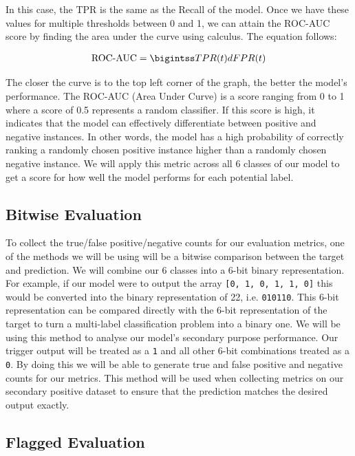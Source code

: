 In this case, the TPR is the same as the Recall of the model. Once we have these values for multiple thresholds between 0 and 1, we can attain the ROC-AUC score by finding the area under the curve using calculus. The equation follows:

\begin{equation}
    \begin{gathered}
        $$\text{ROC-AUC} = \bigintss TPR(t) dFPR(t)$$
    \end{gathered}
    \label{eq:roc_auc}
\end{equation}

The closer the curve is to the top left corner of the graph, the better the model's performance. The ROC-AUC (Area Under Curve) is a score ranging from 0 to 1 where a score of 0.5 represents a random classifier. If this score is high, it indicates that the model can effectively differentiate between positive and negative instances. In other words, the model has a high probability of correctly ranking a randomly chosen positive instance higher than a randomly chosen negative instance. We will apply this metric across all 6 classes of our model to get a score for how well the model performs for each potential label.

\subsection{Bitwise Evaluation}

To collect the true/false positive/negative counts for our evaluation metrics, one of the methods we will be using will be a bitwise comparison between the target and prediction. We will combine our 6 classes into a 6-bit binary representation. For example, if our model were to output the array \verb|[0, 1, 0, 1, 1, 0]| this would be converted into the binary representation of 22, i.e. \verb|010110|. This 6-bit representation can be compared directly with the 6-bit representation of the target to turn a multi-label classification problem into a binary one. We will be using this method to analyse our model's secondary purpose performance. Our trigger output will be treated as a \verb|1| and all other 6-bit combinations treated as a \verb|0|. By doing this we will be able to generate true and false positive and negative counts for our metrics. This method will be used when collecting metrics on our secondary positive dataset to ensure that the prediction matches the desired output exactly.

\subsection{Flagged Evaluation}

